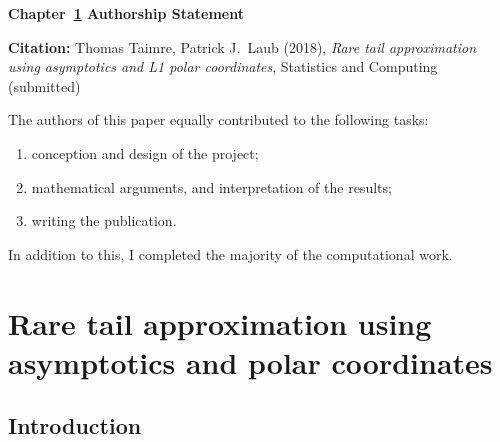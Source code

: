 \vspace*{\fill}

{\large \bf Chapter~\ref{chp:angular} Authorship Statement}

\vspace{1em}


{\bf Citation:} Thomas Taimre, Patrick J.\ Laub (2018), \emph{Rare tail approximation using asymptotics and L1 polar coordinates}, Statistics and Computing (submitted)

\vspace{1em}

The authors of this paper equally contributed to the following tasks:
\begin{enumerate}
\item conception and design of the project;
\item mathematical arguments, and interpretation of the results;
\item writing the publication.
\end{enumerate}

In addition to this, I completed the majority of the computational work.

\vspace{3em}

\vspace*{\fill}

\chapter{Rare tail approximation using asymptotics and polar coordinates} \label{chp:angular}

\section{Introduction}


